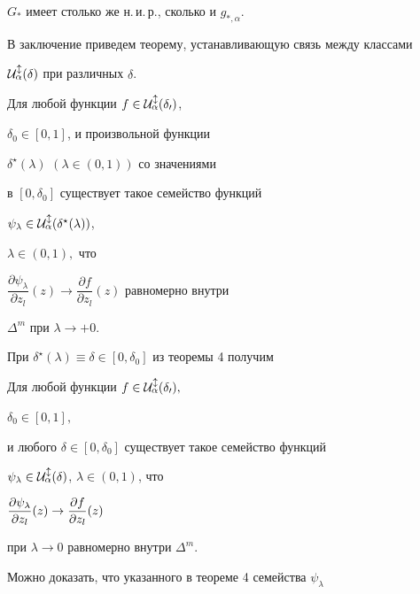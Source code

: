 $G_\ast$ имеет столько же н.\,и.\,р., сколько и $g_{\ast,\alpha}$.





В заключение приведем теорему, устанавливающую связь между классами


$\cal U^l_\alpha(\delta)$ при различных $\delta$.





\begin{thm} Для любой функции $f\in\cal U^l_\alpha(\delta_0)$,


$\delta_0\in [0,1]$, и произвольной функции


$\delta^\star(\lambda)$ $(\lambda\in(0,1))$ со значениями


в $[0,\delta_0]$ существует такое семейство функций


$\psi_\lambda\in\cal U^l_\alpha(\delta^\star(\lambda))$,


$\lambda\in(0,1),$ что


$\dfrac{\partial \psi_\lambda}{\partial z_l}(z)\to\dfrac{\partial


f}{\partial z_l}(z)$ равномерно внутри


$\Delta^m$ при $\lambda\to +0$.


\end{thm}





При $\delta^\star(\lambda)\equiv\delta\in[0,\delta_0]$ из теоремы 4 получим





\begin{cornonum} Для любой функции $f\in\cal U^l_\alpha(\delta_0),$


$\delta_0\in[0,1],$


и любого $\delta\in[0,\delta_0]$ существует такое семейство функций


$\psi_\lambda\in\cal U^l_\alpha(\delta)$, $\lambda\in(0,1)$, что


$\dfrac{\partial \psi_\lambda}{\partial z_l}(z)\to\displaystyle\frac{\partial f}{\partial z_l}(z)$


при $\lambda\to 0$ равномерно внутри $\Delta^m$.


\end{cornonum}





Можно доказать, что указанного в теореме 4 семейства $\psi_\lambda$


